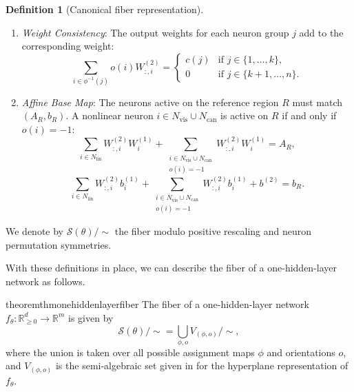 \documentclass{article}
\newtheorem{theorem}{Theorem}
\theoremstyle{definition}
\newtheorem{definition}[theorem]{Definition}
\newcommand{\R}{\mathbb{R}}
\newcommand{\weights}[1]{W^{(#1)}}
\newcommand{\bias}[1]{b^{(#1)}}
\newcommand{\fiber}[1]{\mathcal{S}({#1})}
\newcommand{\modulo}[1]{\big/#1}
\begin{document}
\begin{definition}[Canonical fiber representation]
\begin{enumerate}[leftmargin=*]
    \item \emph{Weight Consistency}: 
    The output weights for each neuron group $j$ add to the corresponding weight:
    \begin{equation} \label{eq:f_jumps}
        \sum_{i \in \phi^{-1}(j)} o(i) \weights{2}_{:,i} = 
        \begin{cases} 
        c(j) & \text{if } j \in \{1, \dots, k\},  \\
        0 & \text{if } %
        j\in\{k+1,\ldots, n\}. 
        \end{cases}
    \end{equation}

    \item \emph{Affine Base Map}: 
    The neurons active on the reference region $R$ must match $(A_R, b_R)$. 
    A nonlinear neuron $i \in N_{\text{vis}} \cup N_{\text{can}}$ is active on $R$ if and only if $o(i) = -1$: 
    \begin{equation} 
        \sum_{i \in N_{\text{lin}}} \weights{2}_{:,i} \weights{1}_i + \sum_{\substack{i \in N_{\text{vis}} \cup N_{\text{can}} \\ o(i) = -1}} \weights{2}_{:,i} \weights{1}_i = A_R , 
    \label{eq:f_base_A}        
    \end{equation}
    \begin{equation} 
        \sum_{i \in N_{\text{lin}}} \weights{2}_{:,i} \bias{1}_i + \sum_{\substack{i \in N_{\text{vis}} \cup N_{\text{can}} \\ o(i) = -1}} \weights{2}_{:,i} \bias{1}_i + \bias{2} = b_R . 
    \label{eq:f_base_b}        
    \end{equation}
\end{enumerate}

We denote by $\fiber{\theta}\modulo{\sim}$ the fiber modulo positive rescaling and neuron permutation symmetries. 
\end{definition}


With these definitions in place, we can describe the fiber of a one-hidden-layer network as follows. 

\begin{restatable}{theorem}{thmonehiddenlayerfiber}
\label{thm:one-hidden-layer-fiber}
The fiber of a one-hidden-layer network $f_\theta \colon \R^d_{\ge 0} \to \R^m$ 
is given by  
$$
\fiber{\theta} \modulo{\sim} = \bigcup_{\phi, o} V_{(\phi, o)} \modulo{\sim},
$$ 
where the union is taken over all possible assignment maps $\phi$ and orientations $o$, and $V_{(\phi,o)}$ is the semi-algebraic set given in  for the hyperplane representation of $f_\theta$.  
\end{restatable} 
\end{document}
